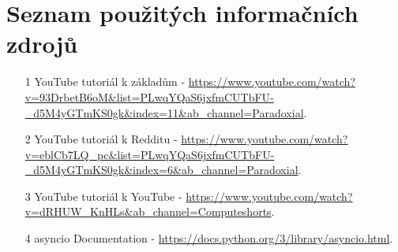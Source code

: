 \documentclass[12pt, a4paper]{report}
\begin{document}
\chapter*{Seznam použitých informačních zdrojů}
\begin{itemize}
    \item [1] YouTube tutoriál k základům - \newline \url{https://www.youtube.com/watch?v=93DrbetB6oM&list=PLwqYQaS6jxfmCUTbFU-_d5M4yGTmKS0gk&index=11&ab_channel=Paradoxial}.
    \item [2] YouTube tutoriál k Redditu - \newline \url{https://www.youtube.com/watch?v=eblCb7LQ_pc&list=PLwqYQaS6jxfmCUTbFU-_d5M4yGTmKS0gk&index=6&ab_channel=Paradoxial}.
    \item [3] YouTube tutoriál k YouTube - \newline \url{https://www.youtube.com/watch?v=dRHUW_KnHLs&ab_channel=Computeshorts}.
    \item [4] asyncio Documentation - \newline \url{https://docs.python.org/3/library/asyncio.html}.
\end{itemize}
\end{document}
